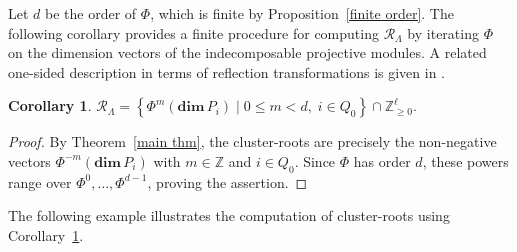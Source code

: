 \documentclass[11pt,a4paper]{amsart}
\newtheorem{corollary}[theorem]{Corollary}
\theoremstyle{definition}
\numberwithin{equation}{section}
\newcommand{\Z}{\mathbb{Z}}
\newcommand{\0}{\mathbf{0}}
\newcommand{\dimv}{\mathbf{dim}\,}
\begin{document}
	 
	 Let $d$ be the order of $\Phi$, which is finite by
	 Proposition~\ref{finite order}. The following corollary provides a finite procedure for computing
	 $\mathcal{R}_\Lambda$ by iterating $\Phi$ on the dimension
	 vectors of the indecomposable projective modules. A related one-sided description in terms of reflection
	 transformations is given in \cite[Theorem~4.10]{Miz}. 
	\begin{corollary} \label{computing R}
		$
		\mathcal{R}_\Lambda
		=
		\left\{
		\Phi^m(\dimv P_i) \mid
		0\leq m<d,\; i\in Q_0
		\right\}
		\cap\Z_{\geq0}^{\ell}.
		$
		\end{corollary}
	\begin{proof}
		By Theorem~\ref{main thm}, the cluster-roots are precisely the
		non-negative vectors $\Phi^{-m}(\dimv P_i)$ with $m\in \Z$ and
		$i\in Q_0$.
		Since $\Phi$ has order $d$, these powers range over
		$\Phi^0,\ldots,\Phi^{d-1}$, proving the assertion.
	\end{proof}
		
		The following example illustrates the computation of
			cluster-roots using Corollary~\ref{computing R}. 
		
\end{document}
